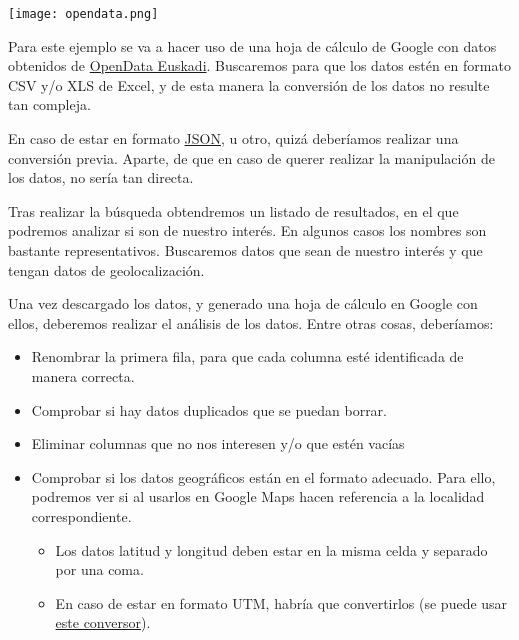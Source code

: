 {
\begin{minipage}{0.3\linewidth}
    \texttt{[image: opendata.png]}
\end{minipage}
\hfill
\begin{minipage}{0.63\linewidth}
    \setlength{\parindent}{0em} %
    \setlength{\parskip}{1.2em}
    \renewcommand{\baselinestretch}{1.4}


    Para este ejemplo se va a hacer uso de una hoja de cálculo de Google con datos obtenidos de \href{https://opendata.euskadi.eus/inicio/}{OpenData Euskadi}. Buscaremos para que los datos estén en formato CSV y/o XLS de Excel, y de esta manera la conversión de los datos no resulte tan compleja.

    En caso de estar en formato \href{https://es.wikipedia.org/wiki/JSON}{JSON}, u otro, quizá deberíamos realizar una conversión previa. Aparte, de que en caso de querer realizar la manipulación de los datos, no sería tan directa.

    Tras realizar la búsqueda obtendremos un listado de resultados, en el que podremos analizar si son de nuestro interés. En algunos casos los nombres son bastante representativos. Buscaremos datos que sean de nuestro interés y que tengan datos de geolocalización.
\end{minipage}
}

Una vez descargado los datos, y generado una hoja de cálculo en Google con ellos, deberemos realizar el análisis de los datos. Entre otras cosas, deberíamos:
\begin{itemize}
    \item Renombrar la primera fila, para que cada columna esté identificada de manera correcta.
    \item Comprobar si hay datos duplicados que se puedan borrar.
    \item Eliminar columnas que no nos interesen y/o que estén vacías
    \item Comprobar si los datos geográficos están en el formato adecuado. Para ello, podremos ver si al usarlos en Google Maps hacen referencia a la localidad correspondiente.
    \begin{itemize}
        \item Los datos latitud y longitud deben estar en la misma celda y separado por una coma.
        \item En caso de estar en formato UTM, habría que convertirlos (se puede usar \href{https://yuki.github.io/utm-converter/}{este conversor}).
    \end{itemize}
\end{itemize}


